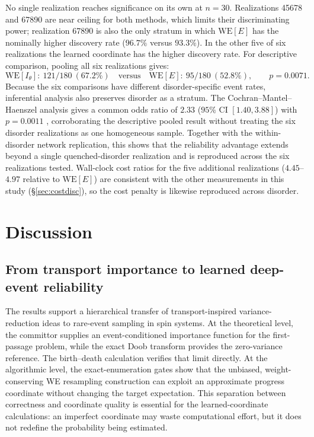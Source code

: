 \documentclass[a4paper,fleqn]{cas-sc}
\newcommand{\WE}{\mathrm{WE}}
\begin{document}
No single realization reaches significance on its own at $n=30$. Realizations 45678 and 67890
are near ceiling for both methods, which limits their discriminating power; realization 67890
is also the only stratum in which $\WE[E]$ has the nominally higher discovery rate ($96.7\%$
versus $93.3\%$). In the other five of six realizations the learned coordinate has the higher
discovery rate. For descriptive comparison, pooling all six realizations gives:
\begin{equation}
\WE[I_\theta]:\ 121/180\ (67.2\%) \quad\text{versus}\quad \WE[E]:\ 95/180\ (52.8\%),
\qquad p=0.0071.
\label{eq:disordergen}
\end{equation}
Because the six comparisons have different disorder-specific event rates, inferential analysis
also preserves disorder as a stratum. The Cochran--Mantel--Haenszel analysis gives a common odds
ratio of $2.33$ ($95\%$ CI $[1.40,3.88]$) with $p=0.0011$ \citep{mantel1959}, corroborating the
descriptive pooled result without treating the six disorder realizations as one homogeneous
sample. Together with the within-disorder network replication, this shows that the reliability
advantage extends beyond a single quenched-disorder realization and is reproduced across the
six realizations tested. Wall-clock cost ratios for the five additional realizations
($4.45$--$4.97$ relative to $\WE[E]$) are consistent with the other measurements in this study
(\S\ref{sec:costdisc}), so the cost penalty is likewise reproduced across disorder.

\FloatBarrier

\section{Discussion}\label{sec:discussion}

\subsection{From transport importance to learned deep-event reliability}\label{sec:established}
The results support a hierarchical transfer of transport-inspired variance-reduction ideas to
rare-event sampling in spin systems. At the theoretical level, the committor supplies an
event-conditioned importance function for the first-passage problem, while the exact Doob
transform provides the zero-variance reference. The birth--death calculation verifies that
limit directly. At the algorithmic level, the exact-enumeration gates show that the unbiased,
weight-conserving WE resampling construction can exploit an approximate progress coordinate
without changing the target expectation. This separation between correctness and coordinate
quality is essential for the learned-coordinate calculations: an imperfect coordinate may
waste computational effort, but it does not redefine the probability being estimated.
\end{document}
